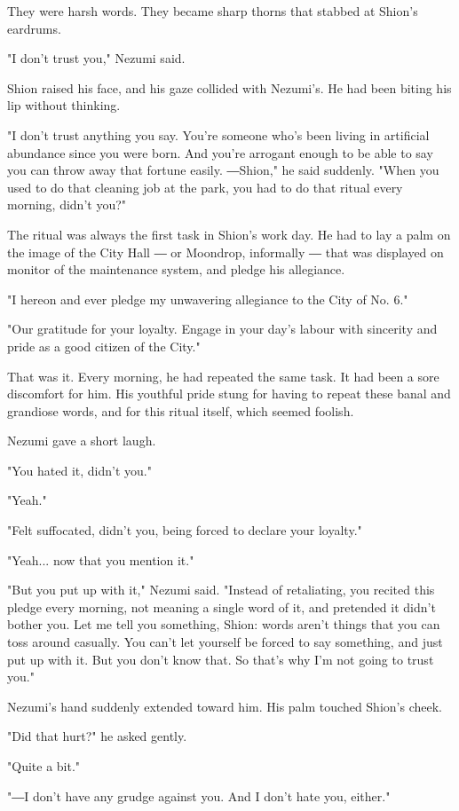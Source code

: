 They were harsh words. They became sharp thorns that stabbed at Shion's
eardrums.

"I don't trust you," Nezumi said.

Shion raised his face, and his gaze collided with Nezumi's. He had been
biting his lip without thinking.

"I don't trust anything you say. You're someone who's been living in
artificial abundance since you were born. And you're arrogant enough to
be able to say you can throw away that fortune easily. ―Shion," he said
suddenly. "When you used to do that cleaning job at the park, you had to
do that ritual every morning, didn't you?"

The ritual was always the first task in Shion's work day. He had to lay
a palm on the image of the City Hall ― or Moondrop, informally ― that
was displayed on monitor of the maintenance system, and pledge his
allegiance.

"I hereon and ever pledge my unwavering allegiance to the City of No.
6."

"Our gratitude for your loyalty. Engage in your day's labour with
sincerity and pride as a good citizen of the City."

That was it. Every morning, he had repeated the same task. It had been a
sore discomfort for him. His youthful pride stung for having to repeat
these banal and grandiose words, and for this ritual itself, which
seemed foolish.

Nezumi gave a short laugh.

"You hated it, didn't you."

"Yeah."

"Felt suffocated, didn't you, being forced to declare your loyalty."

"Yeah... now that you mention it."

"But you put up with it," Nezumi said. "Instead of retaliating, you
recited this pledge every morning, not meaning a single word of it, and
pretended it didn't bother you. Let me tell you something, Shion: words
aren't things that you can toss around casually. You can't let yourself
be forced to say something, and just put up with it. But you don't know
that. So that's why I'm not going to trust you."

Nezumi's hand suddenly extended toward him. His palm touched Shion's
cheek.

"Did that hurt?" he asked gently.

"Quite a bit."

"―I don't have any grudge against you. And I don't hate you, either."

